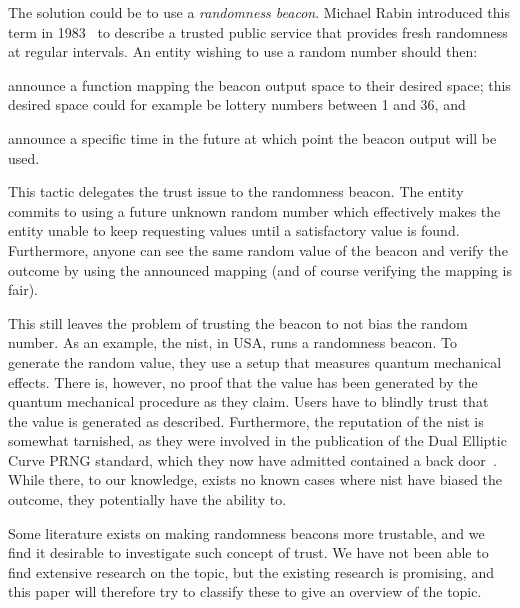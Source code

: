 The solution could be to use a \emph{randomness beacon}.
Michael Rabin introduced this term in 1983~\cite{rabin1983transaction} to describe a trusted public service that provides fresh randomness at regular intervals.
An entity wishing to use a random number should then:
\begin{eromanate*}
    \item announce a function mapping the beacon output space to their desired space; this desired space could for example be lottery numbers between 1 and 36, and
    \item announce a specific time in the future at which point the beacon output will be used.
\end{eromanate*}
This tactic delegates the trust issue to the randomness beacon.
The entity commits to using a future unknown random number which effectively makes the entity unable to keep requesting values until a satisfactory value is found.
Furthermore, anyone can see the same random value of the beacon and verify the outcome by using the announced mapping (and of course verifying the mapping is fair).

This still leaves the problem of trusting the beacon to not bias the random number.
As an example, the \gls{nist}, in USA, runs a randomness beacon.
To generate the random value, they use a setup that measures quantum mechanical effects.
There is, however, no proof that the value has been generated by the quantum mechanical procedure as they claim.
Users have to blindly trust that the value is generated as described.
Furthermore, the reputation of the \gls{nist} is somewhat tarnished, as they were involved in the publication of the Dual Elliptic Curve PRNG standard, which they now have admitted contained a back door~\cite{nist2014backdoor}.
While there, to our knowledge, exists no known cases where \gls{nist} have biased the outcome, they potentially have the ability to.

Some literature exists on making randomness beacons more trustable, and we find it desirable to investigate such concept of trust.
We have not been able to find extensive research on the topic, but the existing research is promising, and this paper will therefore try to classify these to give an overview of the topic.

